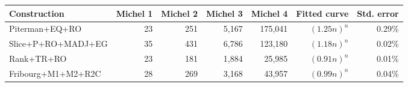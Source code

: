 \begin{tabular}{lrrrrrr}
  \hline
Construction & Michel 1 & Michel 2 & Michel 3 & Michel 4 & Fitted curve & Std. error \\ 
  \hline
Piterman+EQ+RO & 23 & 251 & 5,167 & 175,041 & $(1.25n)^n$ & 0.29\% \\ 
  Slice+P+RO+MADJ+EG & 35 & 431 & 6,786 & 123,180 & $(1.18n)^n$ & 0.02\% \\ 
  Rank+TR+RO & 23 & 181 & 1,884 & 25,985 & $(0.91n)^n$ & 0.01\% \\ 
  Fribourg+M1+M2+R2C & 28 & 269 & 3,168 & 43,957 & $(0.99n)^n$ & 0.04\% \\ 
   \hline
\end{tabular}
